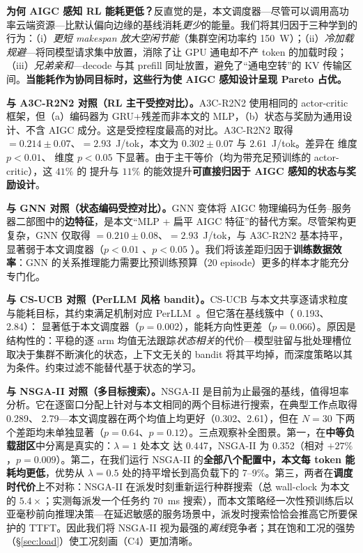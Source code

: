 \textbf{为何 AIGC 感知 RL 能耗更低？}反直觉的是，本文调度器---尽管可以调用高功率云端资源---比默认偏向边缘的基线消耗\emph{更少}的能量。我们将其归因于三种学到的行为：（i）\emph{更短 makespan 放大空闲节能}（集群空闲功率约 150~W）；（ii）\emph{冷加载规避}---将同模型请求集中放置，消除了让 GPU 通电却不产 token 的加载时段；（iii）\emph{兄弟亲和}---decode 与其 prefill 同址放置，避免了“通电空转”的 KV 传输区间。\textbf{当能耗作为协同目标时，这些行为使 AIGC 感知设计呈现 Pareto 占优。}

\textbf{与 A3C-R2N2 对照（RL 主干受控对比）。}A3C-R2N2 使用相同的 actor-critic 框架，但（a）编码器为 GRU+残差而非本文的 MLP，（b）状态与奖励为通用设计、不含 AIGC 成分。这是受控程度最高的对比。A3C-R2N2 取得 \slo${} = 0.214 \pm 0.07$、\etok${} = 2.93$~J/tok，本文为 $0.302 \pm 0.07$ 与 $2.61$~J/tok。差异在 \slo{} 维度 $p<0.01$、\etok{} 维度 $p<0.05$ 下显著。由于主干等价（均为带充足预训练的 actor-critic），这 $41\%$ 的 \slo{} 提升与 $11\%$ 的能效提升\textbf{可直接归因于 AIGC 感知的状态与奖励设计}。

\textbf{与 GNN 对照（状态编码受控对比）。}GNN 变体将 AIGC 物理编码为任务--服务器二部图中的\textbf{边特征}，是本文“MLP + 扁平 AIGC 特征”的替代方案。尽管架构更复杂，GNN 仅取得 \slo${} = 0.210 \pm 0.08$、\etok${} = 2.93$~J/tok，与 A3C-R2N2 基本持平，显著弱于本文调度器（$p<0.01$ \slo、$p<0.05$ \etok）。我们将该差距归因于\textbf{训练数据效率}：GNN 的关系推理能力需要比预训练预算（20 episode）更多的样本才能充分专门化。

\textbf{与 CS-UCB 对照（PerLLM 风格 bandit）。}CS-UCB 与本文共享逐请求粒度与能耗目标，其约束满足机制对应 PerLLM~\cite{yang2024perllm}。但它落在基线簇中（\slo{} 0.193、\etok{} 2.84）：\slo{} 显著低于本文调度器（$p{=}0.002$），能耗方向性更差（$p{=}0.066$）。原因是结构性的：平稳的逐 arm 均值无法跟踪\emph{状态相关}的代价---模型驻留与批处理槽位取决于集群不断演化的状态，上下文无关的 bandit 将其平均掉，而深度策略以其为条件。约束过滤不能替代基于状态的学习。

\textbf{与 NSGA-II 对照（多目标搜索）。}NSGA-II 是目前为止最强的基线，值得坦率分析。它在逐窗口分配上针对与本文相同的两个目标进行搜索，在典型工作点取得 \slo{} 0.289、\etok{} 2.79---本文调度器在两个均值上均更好（0.302、2.61），但在 $N{=}30$ 下两个差距均未单独显著（$p=0.64$、$p=0.12$）。三点观察补全图景。第一，在\textbf{中等负载甜区}中分离是真实的：$\lambda{=}1$ 处本文 \slo{} 达 0.447，NSGA-II 为 0.352（相对 $+27\%$，$p=0.009$）。第二，在我们运行 NSGA-II 的\textbf{全部八个配置中，本文每 token 能耗均更低}，优势从 $\lambda{=}0.5$ 处的持平增长到高负载下的 7--9\%。第三，两者在\textbf{调度时代价}上不对称：NSGA-II 在派发时刻重新运行种群搜索（总 wall-clock 为本文的 $5.4\times$；实测每派发一个任务约 70~ms 搜索），而本文策略经一次性预训练后以亚毫秒前向推理决策---在延迟敏感的服务场景中，派发时搜索恰恰会推高它所要保护的 TTFT。因此我们将 NSGA-II 视为最强的\emph{离线}竞争者；其在饱和工况的强势（\S\ref{sec:load}）使工况刻画（C4）更加清晰。

